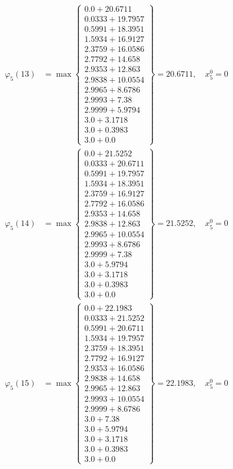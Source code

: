 \documentclass{article}
\begin{document}
\begin{align*}
\varphi_{5}(13) &= \max \left\{ \begin{array}{c}
0.0 + 20.6711 \\
 0.0333 + 19.7957 \\
 0.5991 + 18.3951 \\
 1.5934 + 16.9127 \\
 2.3759 + 16.0586 \\
 2.7792 + 14.658 \\
 2.9353 + 12.863 \\
 2.9838 + 10.0554 \\
 2.9965 + 8.6786 \\
 2.9993 + 7.38 \\
 2.9999 + 5.9794 \\
 3.0 + 3.1718 \\
 3.0 + 0.3983 \\
 3.0 + 0.0
\end{array} \right\}=20.6711, \quad x_{5}^0=0\\
  
\varphi_{5}(14) &= \max \left\{ \begin{array}{c}
0.0 + 21.5252 \\
 0.0333 + 20.6711 \\
 0.5991 + 19.7957 \\
 1.5934 + 18.3951 \\
 2.3759 + 16.9127 \\
 2.7792 + 16.0586 \\
 2.9353 + 14.658 \\
 2.9838 + 12.863 \\
 2.9965 + 10.0554 \\
 2.9993 + 8.6786 \\
 2.9999 + 7.38 \\
 3.0 + 5.9794 \\
 3.0 + 3.1718 \\
 3.0 + 0.3983 \\
 3.0 + 0.0
\end{array} \right\}=21.5252, \quad x_{5}^0=0\\
  
\varphi_{5}(15) &= \max \left\{ \begin{array}{c}
0.0 + 22.1983 \\
 0.0333 + 21.5252 \\
 0.5991 + 20.6711 \\
 1.5934 + 19.7957 \\
 2.3759 + 18.3951 \\
 2.7792 + 16.9127 \\
 2.9353 + 16.0586 \\
 2.9838 + 14.658 \\
 2.9965 + 12.863 \\
 2.9993 + 10.0554 \\
 2.9999 + 8.6786 \\
 3.0 + 7.38 \\
 3.0 + 5.9794 \\
 3.0 + 3.1718 \\
 3.0 + 0.3983 \\
 3.0 + 0.0
\end{array} \right\}=22.1983, \quad x_{5}^0=0\\
  

\end{align*}
\end{document}
